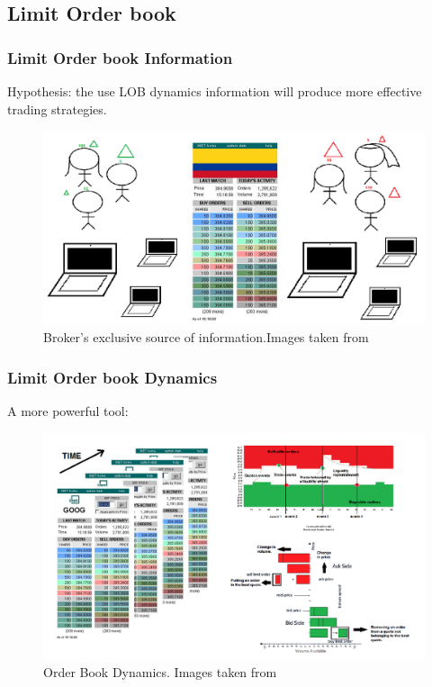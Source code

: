 \documentclass{beamer}
\begin{document}
\subsection{Limit Order book}

\begin{frame}
\frametitle{Limit Order book Information}

Hypothesis: the use LOB dynamics information will produce more effective trading strategies.

\begin{figure}
	\centering
		\includegraphics[scale=0.45]{MenschenBuchRechnerBild.png}
	\caption{Broker's exclusive source of information.Images taken from \cite{cruz}}
	\label{fig:Introduction1}
\end{figure}
\end{frame}


\begin{frame}
\frametitle{Limit Order book Dynamics}

A more powerful tool:

\begin{figure}
	\centering
		\includegraphics[scale=0.45]{OrderBook.png}
		\caption{Order Book Dynamics. Images taken from \cite{cruz}}
	\label{fig:Introduction1}
\end{figure}


\end{frame}
\end{document}

